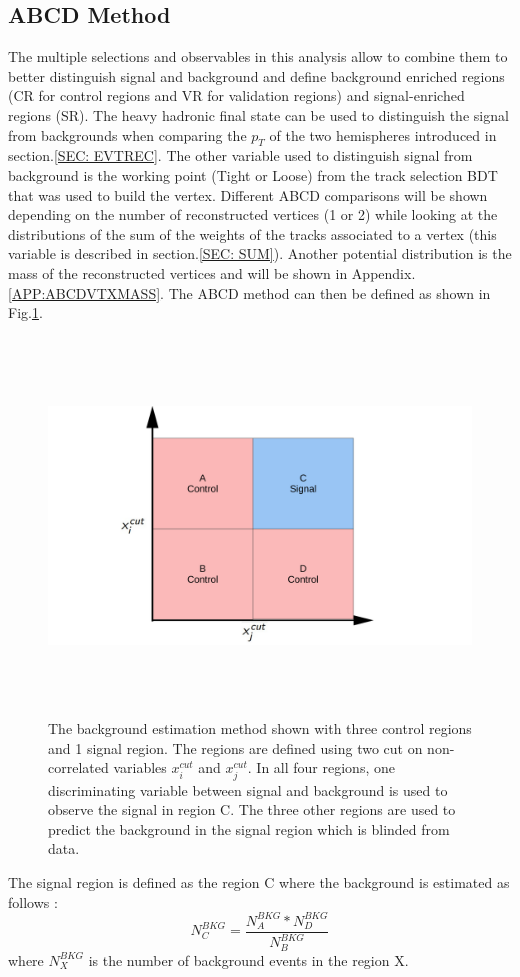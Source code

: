 \documentclass{cernatlasnote}
\begin{document}
    \subsection{ABCD Method}
        \label{ABCD}
        The multiple selections and observables in this analysis allow to combine them to better distinguish signal and background and define background enriched regions (CR for control regions and VR for validation regions) and signal-enriched regions (SR). The heavy hadronic final state can be used to distinguish the signal from backgrounds when comparing the $p_T$ of the two hemispheres introduced in section.\ref{SEC: EVTREC}. The other variable used to distinguish signal from background is the working point (Tight or Loose) from the track selection BDT that was used to build the vertex. Different ABCD comparisons will be shown depending on the number of reconstructed vertices (1 or 2) while looking at the distributions of the sum of the weights of the tracks associated to a vertex (this variable is described in section.\ref{SEC: SUM}). Another potential distribution is the mass of the reconstructed vertices and will be shown in Appendix.\ref{APP:ABCDVTXMASS}. The ABCD method can then be defined as shown in Fig.\ref{fig:ABCD_sch}.
        \begin{figure}[ht]
\centering
\includegraphics[height=10cm, width=17cm, trim= 0cm 0cm 0cm 0cm,clip]{images/ABCD/ABCD.pdf}
\caption{\label{fig:ABCD_sch} The background estimation method shown with three control regions and 1 signal region. The regions are defined using two cut on non-correlated variables $x_{i}^{cut}$ and $x_{j}^{cut}$. In all four regions, one discriminating variable between signal and background is used to observe the signal in region C. The three other regions are used to predict the background in the signal region which is blinded from data.}
\end{figure}  
\FloatBarrier
        The signal region is defined as the region C where the background is estimated as follows :
        \begin{equation}
             N_{C}^{BKG} = \frac{N_{A}^{BKG}*N_{D}^{BKG}}{N_{B}^{BKG}}
        \end{equation} where $N_{X}^{BKG}$ is the number of background events in the region X.
\end{document}
